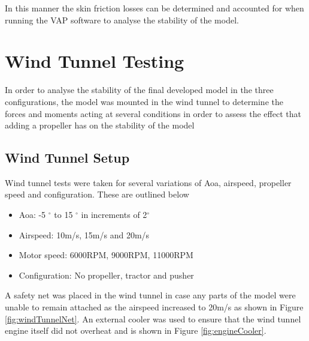 In this manner the skin friction losses can be determined and accounted for when running the VAP software to analyse the stability of the model. 


\section{Wind Tunnel Testing}
In order to analyse the stability of the final developed model in the three configurations, the model was mounted in the wind tunnel to determine the forces and moments acting at several conditions in order to assess the effect that adding a propeller has on the stability of the model


\subsection{Wind Tunnel Setup}

Wind tunnel tests were taken for several variations of Aoa, airspeed, propeller speed and configuration. These are outlined below

\begin{itemize}
    \item Aoa: -5 $^{\circ}$ to 15 $^{\circ}$ in increments of 2$^{\circ}$
    \item Airspeed: 10m/s, 15m/s and 20m/s
    \item Motor speed: 6000RPM, 9000RPM, 11000RPM
    \item Configuration: No propeller, tractor and pusher
\end{itemize}

A safety net was placed in the wind tunnel in case any parts of the model were unable to remain attached as the airspeed increased to 20m/s as shown in Figure \ref{fig:windTunnelNet}. An external cooler was used to ensure that the wind tunnel engine itself did not overheat and is shown in Figure \ref{fig:engineCooler}.

